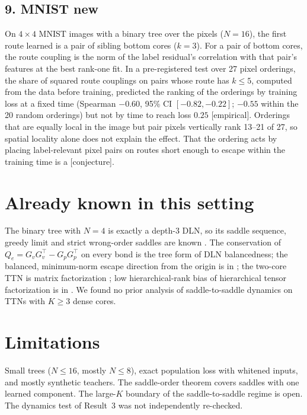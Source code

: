 \documentclass[11pt]{article}
\newcommand{\NEW}{\colorbox{ForestGreen!22}{\textsf{\small new}}}
\newcommand{\ev}[1]{\textsf{\small[#1]}}
\begin{document}
\subsection*{9. MNIST \hfill\NEW}
On $4\times4$ MNIST images with a binary tree over the pixels ($N=16$), the first route learned is a pair of
sibling bottom cores ($k=3$). For a pair of bottom cores, the route coupling is the norm of the label residual's
correlation with that pair's features at the best rank-one fit. In a pre-registered test over 27 pixel
orderings, the share of squared route couplings on pairs whose route has $k\le5$, computed from the data
before training, predicted the ranking of
the orderings by training loss at a fixed time (Spearman $-0.60$, 95\% CI $[-0.82,-0.22]$; $-0.55$ within
the 20 random orderings) but not by time to reach loss $0.25$ \ev{empirical}. Orderings that are equally
local in the image but pair pixels vertically rank 13--21 of 27, so spatial locality alone does not explain
the effect. That the ordering acts by placing label-relevant pixel pairs on routes short enough to escape
within the training time is a \ev{conjecture}.

\section{Already known in this setting}
The binary tree with $N=4$ is exactly a depth-3 DLN, so its saddle sequence, greedy limit and strict
wrong-order saddles are known \citep{saxe2014exact,jacot2022saddletosaddle,achour2024loss}. The conservation
of $Q_e=G_vG_v^\top-G_pG_p^\top$ on every bond is the tree form of DLN balancedness; the balanced, minimum-norm
escape direction from the origin is in \citet{kumar2025early}; the two-core TTN is matrix factorization
\citep{jiang2023algorithmic}; low hierarchical-rank bias of hierarchical tensor factorization is in
\citet{razin2022implicit}. We found no prior analysis of saddle-to-saddle dynamics on TTNs with $K\ge3$
dense cores.

\section{Limitations}
Small trees ($N\le16$, mostly $N\le8$), exact population loss with whitened inputs, and mostly synthetic
teachers. The saddle-order theorem covers saddles with one learned component. The large-$K$ boundary of the
saddle-to-saddle regime is open. The dynamics test of Result~3 was not independently re-checked.



\end{document}

